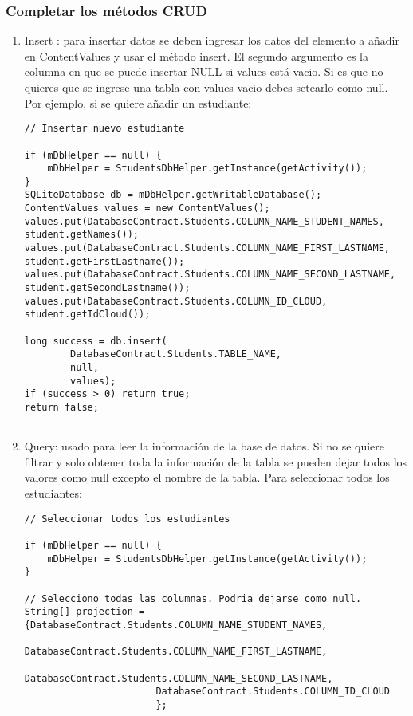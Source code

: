 \documentclass[10pt]{extarticle}
\begin{document}
\subsubsection{Completar los métodos CRUD}
\begin{enumerate}
	\item Insert : para insertar datos se deben ingresar los datos del elemento a añadir en ContentValues y usar el método insert. El segundo argumento es la columna en que se puede insertar NULL si values está vacio. Si es que no quieres que se ingrese una tabla con values vacio debes setearlo como null. Por ejemplo, si se quiere añadir un estudiante:
	
\begin{lstlisting}
// Insertar nuevo estudiante

if (mDbHelper == null) {
    mDbHelper = StudentsDbHelper.getInstance(getActivity());
}
SQLiteDatabase db = mDbHelper.getWritableDatabase();
ContentValues values = new ContentValues();
values.put(DatabaseContract.Students.COLUMN_NAME_STUDENT_NAMES, student.getNames());
values.put(DatabaseContract.Students.COLUMN_NAME_FIRST_LASTNAME, student.getFirstLastname());
values.put(DatabaseContract.Students.COLUMN_NAME_SECOND_LASTNAME, student.getSecondLastname());
values.put(DatabaseContract.Students.COLUMN_ID_CLOUD, student.getIdCloud());

long success = db.insert(
        DatabaseContract.Students.TABLE_NAME, 
        null,								  
        values);
if (success > 0) return true;
return false;
     
\end{lstlisting}

	\item Query: usado para leer la información de la base de datos. Si no se quiere filtrar y solo obtener toda la información de la tabla se pueden dejar todos los valores como null excepto el nombre de la tabla. Para seleccionar todos los estudiantes:

\begin{lstlisting}
// Seleccionar todos los estudiantes

if (mDbHelper == null) {
    mDbHelper = StudentsDbHelper.getInstance(getActivity());
}

// Selecciono todas las columnas. Podria dejarse como null.
String[] projection = {DatabaseContract.Students.COLUMN_NAME_STUDENT_NAMES,
                       DatabaseContract.Students.COLUMN_NAME_FIRST_LASTNAME,
                       DatabaseContract.Students.COLUMN_NAME_SECOND_LASTNAME,
                       DatabaseContract.Students.COLUMN_ID_CLOUD
                       };


\end{lstlisting}
\end{enumerate}
\end{document}

